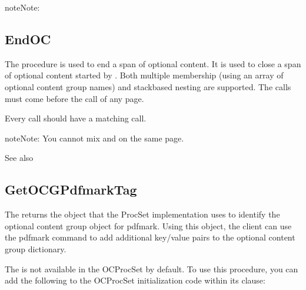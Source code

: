 \documentclass[letterpaper,12pt,english,openany,oneside]{sphinxmanual}
\begin{document}
\begin{sphinxadmonition}{note}{Note:}
\end{sphinxadmonition}


\subsection{EndOC}
\label{\detokenize{pdfmark_OC_Interface:endoc}}
The  procedure is used to end a span of optional content. It is used to close a span of optional content started by  . Both multiple membership (using an array of optional content group names) and stack\sphinxhyphen{}based nesting are supported. The  calls must come before the  call of any page.

Every  call should have a matching  call.

\begin{sphinxadmonition}{note}{Note:}
You cannot mix  and  on the same page.
\end{sphinxadmonition}
\label{\detokenize{pdfmark_OC_Interface:syntax-2}}

\begin{sphinxVerbatim}[commandchars=\\\{\}]
\end{sphinxVerbatim}
\label{\detokenize{pdfmark_OC_Interface:see-also-1}}
See also



\subsection{GetOCGPdfmarkTag}
\label{\detokenize{pdfmark_OC_Interface:getocgpdfmarktag}}
The  returns the object that the ProcSet implementation uses to identify the optional content group object for pdfmark. Using this object, the client can use the  pdfmark command to add additional key/value pairs to the optional content group dictionary.

The  is not available in the OCProcSet  by default. To use this procedure, you can add the following to the OCProcSet initialization code within its  clause:
\end{document}
